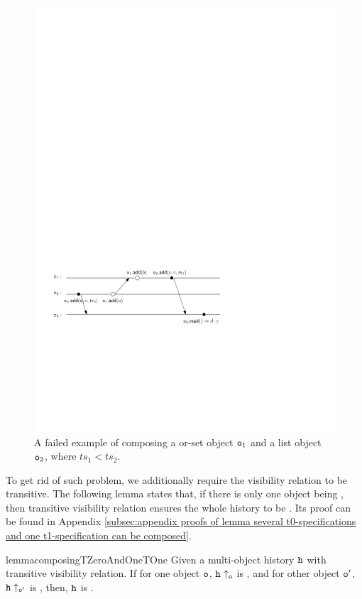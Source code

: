 \begin{figure}[t]
  \centering
  \includegraphics[width=0.6 \textwidth]{figures/MVReg-LWWReg-Nocd.pdf}
\vspace{-10pt}
  \caption{A failed example of composing a \tzerolinearizable or-set object $\mathtt{o}_1$ and a \tonelinearizable list object $\mathtt{o}_2$, where $\mathit{ts}_1 < \mathit{ts}_2$.}
  \label{fig:a failed example of composing a multi-value register with a last-write-win register}
\end{figure}

To get rid of such problem, we additionally require the visibility relation to be transitive. The following lemma states that, if there is only one object being \tonelinearizable{}, then transitive visibility relation ensures the whole history to be \crdtlinearizable{}. Its proof can be found in Appendix \ref{subsec:appendix proofs of lemma several t0-specifications and one t1-specification can be composed}.

\begin{restatable}{lemma}{composingTZeroAndOneTOne}
\label{lemma:several t0-specifications and one t1-specification can be composed}
Given a multi-object history $\mathtt{h}$ with transitive visibility relation. If for one object $\mathtt{o}$, $\mathtt{h} \uparrow_{\mathtt{o}}$ is \tonelinearizable{}, and for other object $\mathtt{o}'$, $\mathtt{h} \uparrow_{\mathtt{o}'}$ is \tzerolinearizable{}, then, $\mathtt{h}$ is \crdtlinearizable{}.
\end{restatable}

